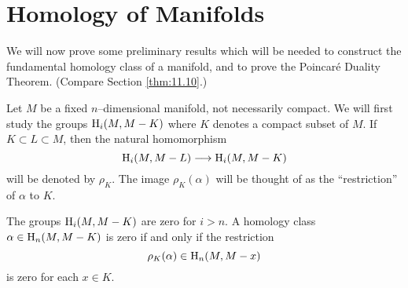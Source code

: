 \documentclass[../main]{subfiles}
\begin{document}
\section{Homology of Manifolds}\;
We will now prove some preliminary results which will be needed to construct the fundamental homology class of a manifold, and to prove the Poincaré Duality Theorem. (Compare Section \ref{thm:11.10}.) 

Let $M$ be a fixed $n$--dimensional manifold, not necessarily compact. We will first study the groups $\operatorname{H}_i(M, M - K)$ where $K$ denotes a compact subset of $M$. If $K \subset L \subset M$, then the natural homomorphism \[\operatorname{H}_i(M, M - L) \longrightarrow \operatorname{H}_i(M, M - K)\] will be denoted by $\rho_K$. The image $\rho_K(\alpha)$ will be thought of as the ``restriction'' of $\alpha$ to $K$. 

\begin{lemma}
\label{lem:A.7}
The groups $\operatorname{H}_i(M, M - K)$ are zero for $i > n$. A homology class $\alpha \in \operatorname{H}_n(M, M - K)$ is zero if and only if the restriction \[\rho_K(\alpha) \in \operatorname{H}_n(M, M - x)\] is zero for each $x \in K$. 
\end{lemma}
\end{document}
